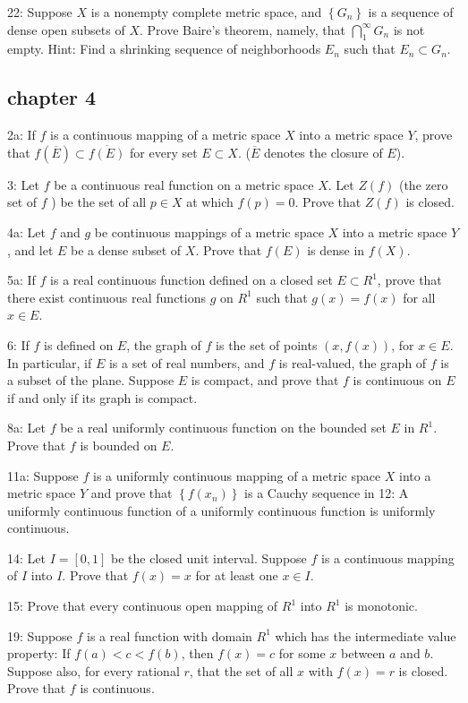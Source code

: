 \documentclass{article}
\begin{document}
22: Suppose $X$ is a nonempty complete metric space, and $\left\{G_{n}\right\}$ is a sequence of dense open subsets of $X$. Prove Baire's theorem, namely, that $\bigcap_{1}^{\infty} G_{n}$ is not empty. Hint: Find a shrinking sequence of neighborhoods $E_{n}$ such that $E_{n} \subset G_{n}$. 

\subsection*{chapter 4}
2a: If $f$ is a continuous mapping of a metric space $X$ into a metric space $Y$, prove that $f(\overline{E}) \subset \overline{f(E)}$ for every set $E \subset X$. ($\overline{E}$ denotes the closure of $E$). 

3: Let $f$ be a continuous real function on a metric space $X$. Let $Z(f)$ (the zero set of $f$ ) be the set of all $p \in X$ at which $f(p)=0$. Prove that $Z(f)$ is closed.

4a: Let $f$ and $g$ be continuous mappings of a metric space $X$ into a metric space $Y$, and let $E$ be a dense subset of $X$. Prove that $f(E)$ is dense in $f(X)$. 

5a: If $f$ is a real continuous function defined on a closed set $E \subset R^{1}$, prove that there exist continuous real functions $g$ on $R^{1}$ such that $g(x)=f(x)$ for all $x \in E$.

6: If $f$ is defined on $E$, the graph of $f$ is the set of points $(x, f(x))$, for $x \in E$. In particular, if $E$ is a set of real numbers, and $f$ is real-valued, the graph of $f$ is a subset of the plane. Suppose $E$ is compact, and prove that $f$ is continuous on $E$ if and only if its graph is compact.

8a: Let $f$ be a real uniformly continuous function on the bounded set $E$ in $R^{1}$. Prove that $f$ is bounded on $E$.

11a: Suppose $f$ is a uniformly continuous mapping of a metric space $X$ into a metric space $Y$ and prove that $\left\{f\left(x_{n}\right)\right\}$ is a Cauchy sequence in 
12: A uniformly continuous function of a uniformly continuous function is uniformly continuous.

14: Let $I=[0,1]$ be the closed unit interval. Suppose $f$ is a continuous mapping of $I$ into $I$. Prove that $f(x)=x$ for at least one $x \in I$.

15: Prove that every continuous open mapping of $R^{1}$ into $R^{1}$ is monotonic.

19: Suppose $f$ is a real function with domain $R^{1}$ which has the intermediate value property: If $f(a)<c<f(b)$, then $f(x)=c$ for some $x$ between $a$ and $b$. Suppose also, for every rational $r$, that the set of all $x$ with $f(x)=r$ is closed. Prove that $f$ is continuous.
\end{document}
